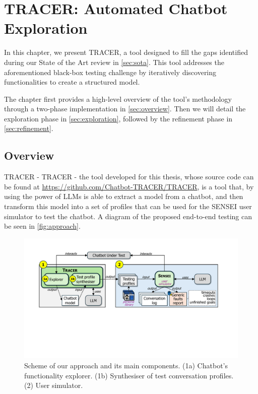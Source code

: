 
\chapter{TRACER: Automated Chatbot Exploration}\label{chapter:tracer}

In this chapter, we present \ac{TRACER},
a tool designed to fill the gaps identified
during our State of the Art review in \autoref{sec:sota}.
This tool addresses the aforementioned black-box testing challenge
by iteratively discovering functionalities to create a structured model.

The chapter first provides a high-level overview
of the tool's methodology through a two-phase implementation in \autoref{sec:overview}.
Then we will detail the exploration phase in \autoref{sec:exploration},
followed by the refinement phase in \autoref{sec:refinement}.

\section{Overview}\label{sec:overview}

\ac{TRACER} - \acl{TRACER} - the tool developed for this thesis,
whose source code can be found at \url{https://github.com/Chatbot-TRACER/TRACER},
is a tool that, by using the power of \acp{LLM}
is able to extract a model from a chatbot,
and then transform this model into a set of profiles
that can be used for the SENSEI
\autocite{delaraSensei, delaraAutomatedEndtoEndTesting2025} user simulator
to test the chatbot.
A diagram of the proposed end-to-end testing
can be seen in \autoref{fig:approach}.


\begin{figure}[!htpb]
  \centering
  \includegraphics[width=\linewidth]{figures/approach.pdf}
  \caption{Scheme of our approach and its main components.
    (1a) Chatbot’s functionality explorer.
    (1b) Synthesiser of test conversation profiles.
    (2) User simulator.}
  \label{fig:approach}
\end{figure}


